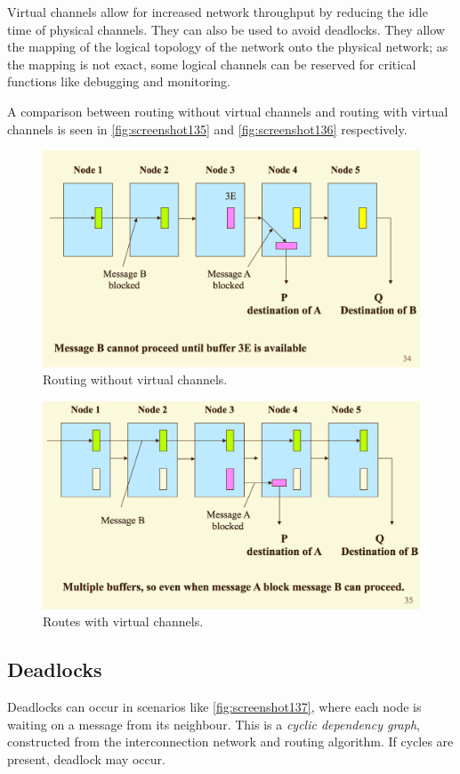 Virtual channels allow for increased network throughput by reducing the idle time of physical channels. They can also be used to avoid deadlocks. They allow the mapping of the logical topology of the network onto the physical network; as the mapping is not exact, some logical channels can be reserved for critical functions like debugging and monitoring.

A comparison between routing without virtual channels and routing with virtual channels is seen in \autoref{fig:screenshot135} and \autoref{fig:screenshot136} respectively.
\begin{figure}
\centering
\includegraphics[width=0.7\linewidth]{screenshot135}
\caption{Routing without virtual channels.}
\label{fig:screenshot135}
\end{figure}

\begin{figure}
\centering
\includegraphics[width=0.7\linewidth]{screenshot136}
\caption{Routes with virtual channels.}
\label{fig:screenshot136}
\end{figure}

\subsection{Deadlocks}
Deadlocks can occur in scenarios like \autoref{fig:screenshot137}, where each node is waiting on a message from its neighbour. This is a \textit{cyclic dependency graph}, constructed from the interconnection network and routing algorithm. If cycles are present, deadlock may occur.

